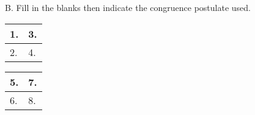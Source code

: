 \def\figdir{/storage/emulated/0/Documents/documents/latex/1920/Grade-8/3rd/triangle-congruence-postulates/f}

B. Fill in the blanks then indicate the congruence postulate used. 
\begin{center}
\noindent\begin{minipage}{20em}
\begin{tabularx}{\textwidth}{|X|X|}
\hline
1.  & 
3.  \\
\hline 
2.  & 
4.  \\
\hline
\end{tabularx} 
\end{minipage}
\end{center} 
 
\begin{center}
\noindent\begin{minipage}{20em}
\begin{tabularx}{\textwidth}{|X|X|}
\hline
5.  & 
7.  \\
\hline 
6.  & 
8.  \\
\hline
\end{tabularx} 
\end{minipage}
\end{center} 


